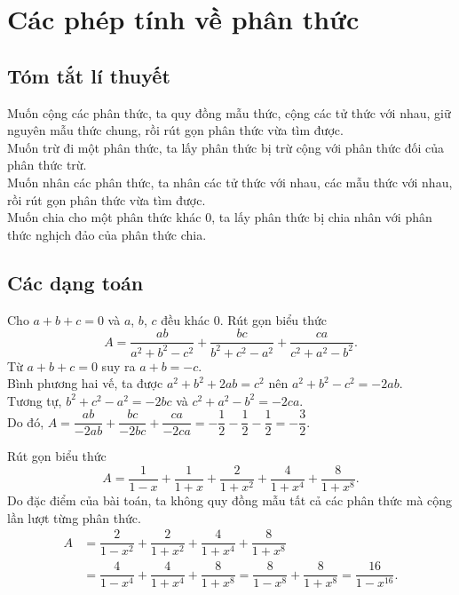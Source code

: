 \section{Các phép tính về phân thức}
\subsection{Tóm tắt lí thuyết}
Muốn cộng các phân thức, ta quy đồng mẫu thức, cộng các tử thức với nhau, giữ nguyên mẫu thức chung, rồi rút gọn phân thức vừa tìm được.\\
Muốn trừ đi một phân thức, ta lấy phân thức bị trừ cộng với phân thức đối của phân thức trừ.\\
Muốn nhân các phân thức, ta nhân các tử thức với nhau, các mẫu thức với nhau, rồi rút gọn phân thức vừa tìm được.\\
Muốn chia cho một phân thức khác $0$, ta lấy phân thức bị chia nhân với phân thức nghịch đảo của phân thức chia.


\subsection{Các dạng toán}

\begin{vd}%
 Cho $a+b+c=0$ và $a$, $b$, $c$ đều khác $0$. Rút gọn biểu thức
 $$ A = \dfrac{ab}{a^2+b^2-c^2}+\dfrac{bc}{b^2+c^2-a^2}+\dfrac{ca}{c^2+a^2-b^2}.$$
 \loigiai
  {
  Từ $a+b+c=0$ suy ra $a+b=-c$.\\
  Bình phương hai vế, ta được $a^2+b^2+2ab=c^2$ nên $a^2+b^2-c^2=-2ab$.\\
  Tương tự, $b^2+c^2-a^2=-2bc$ và $c^2+a^2-b^2=-2ca$.\\
  Do đó, $A = \dfrac{ab}{-2ab} +\dfrac{bc}{-2bc}+ \dfrac{ca}{-2ca}= -\dfrac{1}{2}-\dfrac{1}{2} -\dfrac{1}{2}= -\dfrac{3}{2}$. 	
  }
\end{vd}

\begin{vd}%
 Rút gọn biểu thức
 $$A = \dfrac{1}{1-x}+\dfrac{1}{1+x}+\dfrac{2}{1+x^2}+\dfrac{4}{1+x^4}+\dfrac{8}{1+x^8}.$$
 \loigiai
  {
  Do đặc điểm của bài toán, ta không quy đồng mẫu tất cả các phân thức mà cộng lần lượt từng phân thức.\\
  $$\begin{array}{ll}
  A & = \dfrac{2}{1-x^2}+\dfrac{2}{1+x^2}+\dfrac{4}{1+x^4}+\dfrac{8}{1+x^8}\\
  & = \dfrac{4}{1-x^4}+\dfrac{4}{1+x^4}+\dfrac{8}{1+x^8} = \dfrac{8}{1-x^8}+\dfrac{8}{1+x^8} = \dfrac{16}{1-x^{16}}.
  \end{array}$$	
  }
\end{vd}

